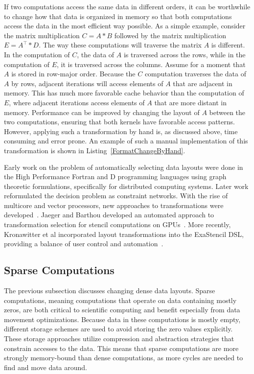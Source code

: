 If two computations access the same data in different orders, it can be worthwhile to change how that data is organized in memory so that both computations access the data in the most efficient way possible.
As a simple example, consider the matrix multiplication $C = A * B$ followed by the matrix multiplication $E = A^{\top} * D$. 
The way these computations will traverse the matrix $A$ is different. 
In the computation of $C$, the data of $A$ is traversed across the rows, while in the computation of $E$, it is traversed across the columns.
Assume for a moment that $A$ is stored in row-major order.
Because the $C$ computation traverses the data of $A$ by rows, adjacent iterations will access elements of $A$ that are adjacent in memory.
This has much more favorable cache behavior than the computation of $E$, where adjacent iterations access elements of $A$ that are more distant in memory.
Performance can be improved by changing the layout of $A$ between the two computations, ensuring that both kernels have favorable access patterns.
However, applying such a transformation by hand is, as discussed above, time consuming and error prone. 
An example of such a manual implementation of this transformation is shown in Listing~\ref{FormatChangeByHand}.

Early work on the problem of automatically selecting data layouts were done in the High Performance Fortran and D programming languages using graph theoretic formulations, specifically for distributed computing systems\cite{kennedy1995automatic,kennedy1998automatic}.
Later work reformulated the decision problem as constraint networks\cite{chen2005constraint}.
With the rise of multicore and vector processors, new approaches to transformations were developed~\cite{lu2009data,henretty2011data,zhang2011optimizing}.
Jaeger and Barthou developed an automated approach to transformation selection for stencil computations on GPUs~\cite{jaeger2012automatic}.
More recently, Kronawitter et al incorporated layout transformations into the ExaStencil DSL, providing a balance of user control and automation~\cite{kronawitter2018automatic}.

\subsection{Sparse Computations}

The previous subsection discusses changing dense data layouts.
Sparse computations, meaning computations that operate on data containing mostly zeros, are both critical to scientific computing and benefit especially from data movement optimizations.
Because data in these computations is mostly empty, different storage schemes are used to avoid storing the zero values explicitly. 
These storage approaches utilize compression and abstraction strategies that constrain accesses to the data.
This means that sparse computations are more strongly memory-bound than dense computations, as more cycles are needed to find and move data around.


